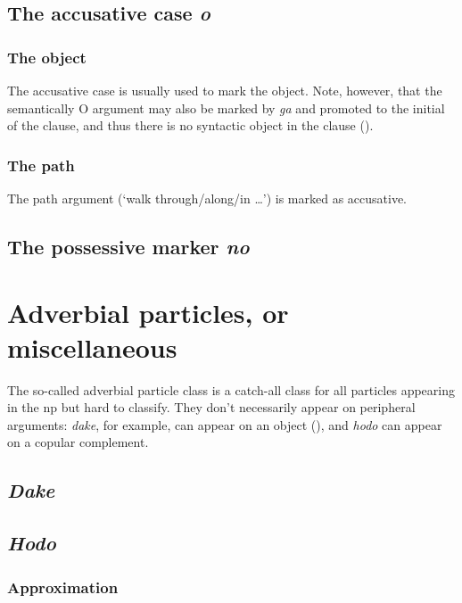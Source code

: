 \documentclass[UTF8, a4paper, oneside, scheme=plain]{ctexrep}
\newcommand{\corpus}[1]{\emph{#1}}
\newcommand{\translate}[1]{`#1'}
\begin{document}
\subsection{The accusative case \corpus{o}}

\subsubsection{The object}

The accusative case is usually used to mark the object.
Note, however, that the semantically O argument may also be marked by \corpus{ga} 
and promoted to the initial of the clause, 
and thus there is no syntactic object in the clause 
().

\subsubsection{The path}

The path argument (\translate{walk through/along/in \dots}) is marked as accusative.

\subsection{The possessive marker \corpus{no}}

\section{Adverbial particles, or miscellaneous}\label{sec:adverbial-particle}

The so-called adverbial particle class is a catch-all class for all particles appearing in the \ac{np}
but hard to classify.
They don't necessarily appear on peripheral arguments:
\corpus{dake}, for example, can appear on an object (),
and \corpus{hodo} can appear on a copular complement.

\subsection{\corpus{Dake}}\label{sec:dake}

\subsection{\corpus{Hodo}}

\subsubsection{Approximation}
\end{document}
